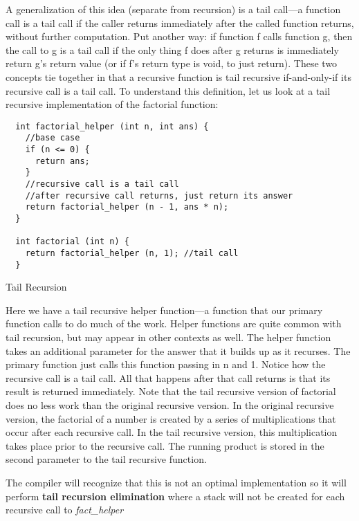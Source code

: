 \documentclass[11pt, a4paper]{article}
\begin{document}
A generalization of this idea (separate from recursion) is a tail call—a function call is a tail call if the caller returns immediately after the called function returns, without further computation. Put another way: if function f calls function g, then the call to g is a tail call if the only thing f does after g returns is immediately return g’s return value (or if f’s return type is void, to just return). These two concepts tie together in that a recursive function is tail recursive if-and-only-if its recursive call is a tail call. To understand this definition, let us look at a tail recursive implementation of the factorial function:

\begin{listing}
\begin{verbatim}
  int factorial_helper (int n, int ans) { 
    //base case
    if (n <= 0) {
      return ans;
    }
    //recursive call is a tail call
    //after recursive call returns, just return its answer 
    return factorial_helper (n - 1, ans * n); 
  }

  int factorial (int n) {
    return factorial_helper (n, 1); //tail call
  }
\end{verbatim}
\caption{Tail Recursion}
\label{lst:tail_recursion}
\end{listing}


Here we have a tail recursive helper function—a function that our primary function calls to do much of the work. Helper functions are quite common with tail recursion, but may appear in other contexts as well. The helper function takes an additional parameter for the answer that it builds up as it recurses. The primary function just calls this function passing in n and 1. Notice how the recursive call is a tail call. All that happens after that call returns is that its result is returned immediately. Note that the tail recursive version of factorial does no less work than the original recursive version. In the original recursive version, the factorial of a number is created by a series of multiplications that occur after each recursive call. In the tail recursive version, this multiplication takes place prior to the recursive call. The running product is stored in the second parameter to the tail recursive function.




The compiler will recognize that this is not an optimal implementation so it will perform \textbf{tail recursion elimination} where a stack will not be created for each recursive call to \textit{fact\_helper} 
\end{document}
